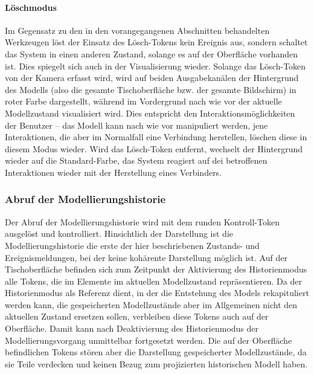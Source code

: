 \paragraph{Löschmodus}

Im Gegensatz zu den in den vorangegangenen Abschnitten behandelten Werkzeugen löst der Einsatz des Lösch-Tokens kein Ereignis aus, sondern schaltet das System in einen anderen Zustand, solange es auf der Oberfläche vorhanden ist. Dies spiegelt sich auch in der Visualisierung wieder. Solange das Lösch-Token von der Kamera erfasst wird, wird auf beiden Ausgabekanälen der Hintergrund des Modells (also die gesamte Tischoberfläche bzw. der gesamte Bildschirm) in roter Farbe dargestellt, während im Vordergrund nach wie vor der aktuelle Modellzustand visualisiert wird. Dies entspricht den Interaktionsmöglichkeiten der Benutzer -- das Modell kann nach wie vor manipuliert werden, jene Interaktionen, die aber im Normalfall eine Verbindung herstellen, löschen diese in diesem Modus wieder. Wird das Lösch-Token entfernt, wechselt der Hintergrund wieder auf die Standard-Farbe, das System reagiert auf dei betroffenen Interaktionen wieder mit der Herstellung eines Verbinders.


\subsubsection{Abruf der Modellierungshistorie} %
\label{ssub:abruf_der_modellierungshistorie}

Der Abruf der Modellierungshistorie wird mit dem runden Kontroll-Token ausgelöst und kontrolliert. Hinsichtlich der Darstellung ist die Modellierungshistorie die erste der hier beschriebenen Zustands- und Ereignismeldungen, bei der keine kohärente Darstellung möglich ist. Auf der Tischoberfläche befinden sich zum Zeitpunkt der Aktivierung des Historienmodus alle Tokens, die im Elemente im aktuellen Modellzustand repräsentieren. Da der Historienmodus als Referenz dient, in der die Entstehung des Models rekapituliert werden kann, die gespeicherten Modellzustände aber im Allgemeinen nicht den aktuellen Zustand ersetzen sollen, verbleiben diese Tokens auch auf der Oberfläche. Damit kann nach Deaktivierung des Historienmodus der Modellierungsvorgang unmittelbar fortgesetzt werden. Die auf der Oberfläche befindlichen Tokens stören aber die Darstellung gespeicherter Modellzustände, da sie Teile verdecken und keinen Bezug zum projizierten historischen Modell haben.

